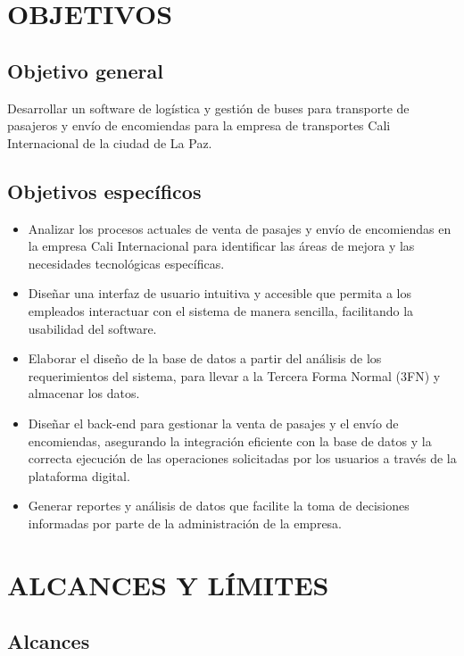 \section{OBJETIVOS}
	\subsection{Objetivo general}
	
		Desarrollar un software de logística y gestión de buses para transporte de pasajeros y envío de encomiendas para la empresa de transportes Cali Internacional de la ciudad de La Paz.
		
	\subsection{Objetivos específicos}
	
		\begin{itemize}[label=$\bullet$, left=0cm, labelsep = 1.05cm, topsep = 0pt, parsep = 0pt]
			
			\item Analizar los procesos actuales de venta de pasajes y envío de encomiendas en la empresa Cali Internacional para identificar las áreas de mejora y las necesidades tecnológicas específicas.
			\item Diseñar una interfaz de usuario intuitiva y accesible que permita a los empleados interactuar con el sistema de manera sencilla, facilitando la usabilidad del software.
			\item Elaborar el diseño de la base de datos a partir del análisis de los requerimientos del sistema, para llevar a la Tercera Forma Normal (3FN) y almacenar los datos.
			\item Diseñar el back-end para gestionar la venta de pasajes y el envío de encomiendas, asegurando la integración eficiente con la base de datos y la correcta ejecución de las operaciones solicitadas por los usuarios a través de la plataforma digital.    
			\item Generar reportes y análisis de datos que facilite la toma de decisiones informadas por parte de la administración de la empresa.
			
		\end{itemize}
		
\section{ALCANCES Y LÍMITES}
	\subsection{Alcances}
		
